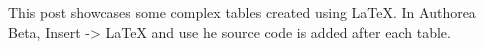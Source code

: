 This post showcases some complex tables created using LaTeX. In Authorea Beta, Insert -> LaTeX and use he source code is added after each table.

\newline